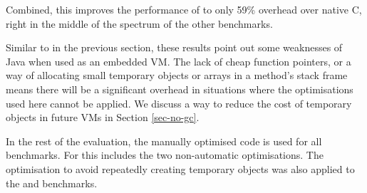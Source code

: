 Combined, this improves the performance of  to only 59\% overhead over native C, right in the middle of the spectrum of the other benchmarks.

Similar to  in the previous section, these results point out some weaknesses of Java when used as an embedded VM. The lack of cheap function pointers, or a way of allocating small temporary objects or arrays in a method's stack frame means there will be a significant overhead in situations where the optimisations used here cannot be applied. We discuss a way to reduce the cost of temporary objects in future VMs in Section \ref{sec-no-gc}.

In the rest of the evaluation, the manually optimised code is used for all benchmarks. For  this includes the two non-automatic optimisations. The optimisation to avoid repeatedly creating temporary objects was also applied to the  and  benchmarks.
